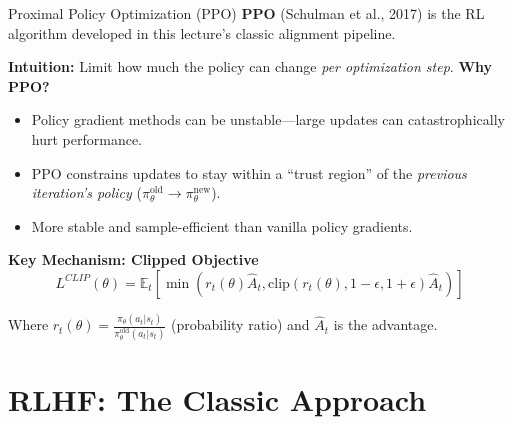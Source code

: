 \documentclass[xcolor=svgnames, 10pt, handout]{beamer}
\begin{document}
\begin{frame}{Proximal Policy Optimization (PPO)}
    \textbf{PPO} (Schulman et al., 2017) is the RL algorithm developed in this lecture's classic alignment pipeline.
    \pause

    \textbf{Intuition:} Limit how much the policy can change \textit{per optimization step}.
    \pause
    \textbf{Why PPO?}
    \begin{itemize}
        \item Policy gradient methods can be unstable---large updates can catastrophically hurt performance.
        \pause
        \item PPO constrains updates to stay within a ``trust region'' of the \textit{previous iteration's policy} ($\pi_{\theta}^{\text{old}} \rightarrow \pi_{\theta}^{\text{new}}$).
        \pause
        \item More stable and sample-efficient than vanilla policy gradients.
    \end{itemize}
    \pause

    \textbf{Key Mechanism: Clipped Objective}
    \begin{equation*}
        L^{CLIP}(\theta) = \mathbb{E}_t \left[ \min\left( r_t(\theta) \hat{A}_t, \text{clip}(r_t(\theta), 1-\epsilon, 1+\epsilon) \hat{A}_t \right) \right]
    \end{equation*}

    Where $r_t(\theta) = \frac{\pi_\theta(a_t|s_t)}{\pi_{\theta}^{\text{old}}(a_t|s_t)}$ (probability ratio) and $\hat{A}_t$ is the advantage.
    \pause


\end{frame}

\section{RLHF: The Classic Approach}
\end{document}
